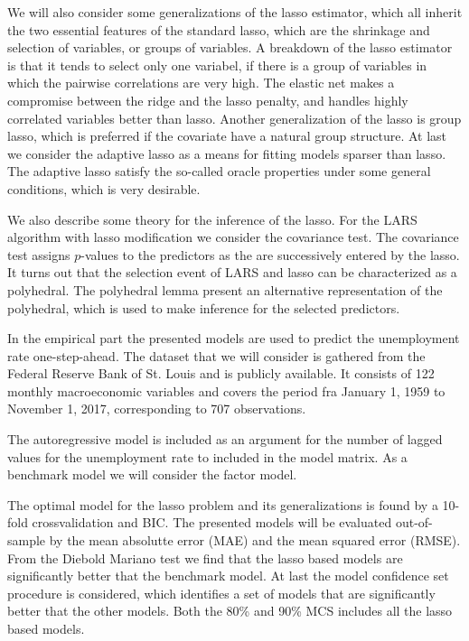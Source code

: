 We will also consider some generalizations of the lasso estimator, which all inherit the two essential features of the standard lasso, which are the shrinkage and selection of variables, or groups of variables.
A breakdown of the lasso estimator is that it tends to select only one variabel, if there is a group of variables in which the pairwise correlations are very high.
The elastic net makes a compromise between the ridge and the lasso penalty, and handles highly correlated variables better than lasso. 
Another generalization of the lasso is group lasso, which is preferred if the covariate have a natural group structure.
At last we consider the adaptive lasso as a means for fitting models sparser than lasso.
The adaptive lasso satisfy the so-called oracle properties under some general conditions, which is very desirable. 

We also describe some theory for the inference of the lasso.
For the LARS algorithm with lasso modification we consider the covariance test.
The covariance test assigns \(p\)-values to the predictors as the are successively entered by the lasso.
It turns out that the selection event of LARS and lasso can be characterized as a polyhedral.
The polyhedral lemma present an alternative representation of the polyhedral, which is used to make inference for the selected predictors.

In the empirical part the presented models are used to predict the unemployment rate one-step-ahead.
The dataset that we will consider is gathered from the Federal Reserve Bank of St. Louis and is publicly available.
It consists of 122 monthly macroeconomic variables and covers the period fra January 1, 1959 to November 1, 2017, corresponding to 707 observations.

The autoregressive model is included as an argument for the number of lagged values for the unemployment rate to included in the model matrix.
As a benchmark model we will consider the factor model.

The optimal model for the lasso problem and its generalizations is found by a 10-fold crossvalidation and BIC.
The presented models will be evaluated out-of-sample by the mean absolutte error (MAE) and the mean squared error (RMSE).
From the Diebold Mariano test we find that the lasso based models are significantly better that the benchmark model. 
At last the model confidence set procedure is considered, which identifies a set of models that are significantly better that the other models.
Both the 80\% and 90\% MCS includes all the lasso based models.